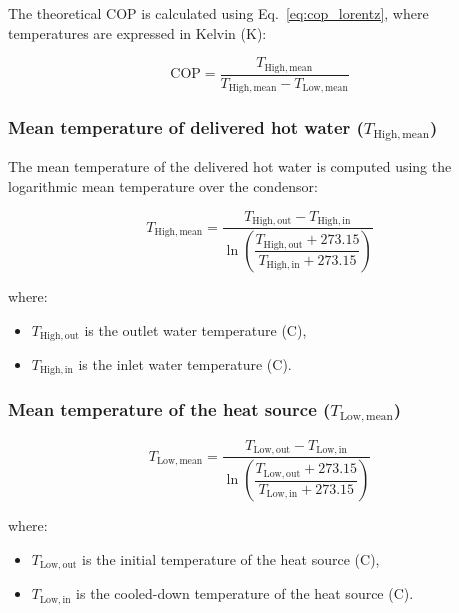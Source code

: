 \documentclass[11pt,a4paper]{report}
\begin{document}
The theoretical $\text{COP}$ is calculated using Eq.~\eqref{eq:cop_lorentz}, where temperatures are expressed in Kelvin ($\text{K}$):

\begin{equation}
\mathrm{COP} = \frac{T_{\mathrm{High,mean}}}{T_{\mathrm{High,mean}} - T_{\mathrm{Low,mean}}}
\label{eq:cop_lorentz}
\end{equation}

\subsubsection{Mean temperature of delivered hot water ($T_{\mathrm{High,mean}}$)}

The mean temperature of the delivered hot water is computed using the logarithmic mean temperature over the condensor:

\begin{equation}
T_{\mathrm{High,mean}} =
\frac{T_{\mathrm{High,out}} - T_{\mathrm{High,in}}}
{\ln\!\left( \dfrac{T_{\mathrm{High,out}} + 273.15}{T_{\mathrm{High,in}} + 273.15} \right)}
\end{equation}

where:
\begin{itemize}
    \item $T_{\mathrm{High,out}}$ is the outlet water temperature (\textdegree C),
    \item $T_{\mathrm{High,in}}$ is the inlet water temperature (\textdegree C).
\end{itemize}

\subsubsection{Mean temperature of the heat source ($T_{\mathrm{Low,mean}}$)}

\begin{equation}
T_{\mathrm{Low,mean}} =
\frac{T_{\mathrm{Low,out}} - T_{\mathrm{Low,in}}}
{\ln\!\left( \dfrac{T_{\mathrm{Low,out}} + 273.15}{T_{\mathrm{Low,in}} + 273.15} \right)}
\end{equation}

where:
\begin{itemize}
    \item $T_{\mathrm{Low,out}}$ is the initial temperature of the heat source (\textdegree C),
    \item $T_{\mathrm{Low,in}}$ is the cooled-down temperature of the heat source (\textdegree C).
\end{itemize}
\end{document}
